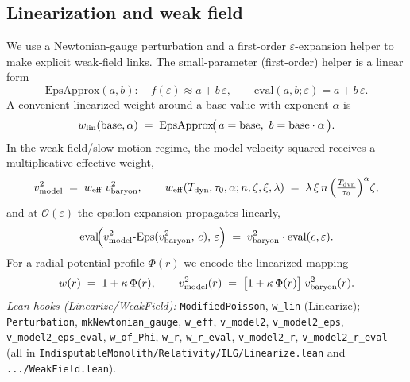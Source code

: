 \documentclass[12pt,a4paper]{article}
\begin{document}
\subsection{Linearization and weak field}
We use a Newtonian-gauge perturbation and a first-order \(\varepsilon\)-expansion helper to make explicit weak-field links. The small-parameter (first-order) helper is a linear form
\begin{equation}
  \text{EpsApprox}(a,b):\quad f(\varepsilon)\approx a + b\,\varepsilon,\qquad
  \mathrm{eval}(a,b;\varepsilon)=a+b\,\varepsilon.
  \label{eq:epsapprox}
\end{equation}
A convenient linearized weight around a base value with exponent \(\alpha\) is
\begin{equation}
  w_{\rm lin}(\text{base},\alpha)\;=\;\mathrm{EpsApprox}\!\bigl(\,a=\text{base},\ b=\text{base}\cdot\alpha\,\bigr).
  \label{eq:wlin}
\end{equation}
In the weak-field/slow-motion regime, the model velocity-squared receives a multiplicative effective weight,
\begin{equation}
  v_{\rm model}^2 \;=\; w_{\rm eff}\;v_{\rm baryon}^2,
  \qquad
  w_{\rm eff}(T_{\rm dyn},\tau_0,\alpha;n,\zeta,\xi,\lambda)
  \;=\;\lambda\,\xi\,n\,\Bigl(\tfrac{T_{\rm dyn}}{\tau_0}\Bigr)^{\alpha}\zeta,
  \label{eq:weakfield-weight}
\end{equation}
and at \(\mathcal{O}(\varepsilon)\) the epsilon-expansion propagates linearly,
\begin{equation}
  \mathrm{eval}\!\Bigl(v_{\rm model}^2\text{-}\mathrm{Eps}(v_{\rm baryon}^2,\,e),\,\varepsilon\Bigr)
  \;=\; v_{\rm baryon}^2\cdot \mathrm{eval}(e,\varepsilon).
  \label{eq:weakfield-eps}
\end{equation}
For a radial potential profile \(\Phi(r)\) we encode the linearized mapping
\begin{equation}
  w(r)\;=\;1+\kappa\,\Phi(r),\qquad
  v_{\rm model}^2(r) \;=\; \bigl[1+\kappa\,\Phi(r)\bigr]\;v_{\rm baryon}^2(r).
  \label{eq:weakfield-radial}
\end{equation}
\emph{Lean hooks (Linearize/WeakField):}
\texttt{ModifiedPoisson}, \texttt{w\_lin} (Linearize); \texttt{Perturbation}, \texttt{mkNewtonian\_gauge},
\texttt{w\_eff}, \texttt{v\_model2}, \texttt{v\_model2\_eps}, \texttt{v\_model2\_eps\_eval},
\texttt{w\_of\_Phi}, \texttt{w\_r}, \texttt{w\_r\_eval}, \texttt{v\_model2\_r}, \texttt{v\_model2\_r\_eval}
(all in \texttt{IndisputableMonolith/Relativity/ILG/Linearize.lean} and \texttt{.../WeakField.lean}).
\end{document}
